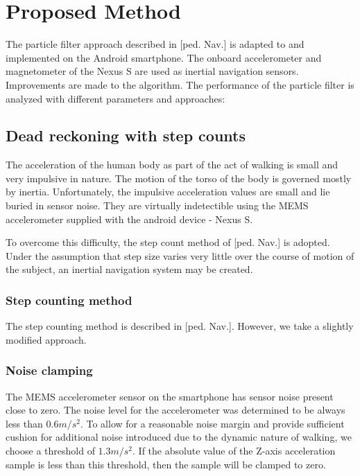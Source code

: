 \chapter{Proposed Method}
The particle filter approach described in [ped. Nav.] is adapted to and implemented on the Android smartphone. The onboard accelerometer and magnetometer of the Nexus S are used as inertial navigation sensors. Improvements are made to the algorithm. The performance of the particle filter is analyzed with different parameters and approaches:

\section{Dead reckoning with step counts}

The acceleration of the human body as part of the act of walking is small and very impulsive
in nature. The motion of the torso of the body is governed mostly by inertia. 
Unfortunately, the impulsive acceleration values are small and lie buried in sensor
noise. They are virtually indetectible using the MEMS accelerometer supplied with the android
device - Nexus S.

To overcome this difficulty, the step count method of [ped. Nav.] is adopted. Under
the assumption that step size varies very little over the course of motion of the subject,
an inertial navigation system may be created.

\subsection{Step counting method}

The step counting method is described in [ped. Nav.]. However, we take a slightly
modified approach. 

\subsection{Noise clamping\label{sec:NoiseClamping}}

The MEMS accelerometer sensor on the smartphone has sensor noise present close to
zero. The noise level for the accelerometer was determined to be always less than
$0.6 m/s^2$. To allow for a reasonable noise margin and provide sufficient cushion
for additional noise introduced due to the dynamic nature of walking, we choose
a threshold of $1.3 m/s^2$. If the absolute value of the Z-axis acceleration
sample is less than this threshold, then the sample will be clamped to zero.

